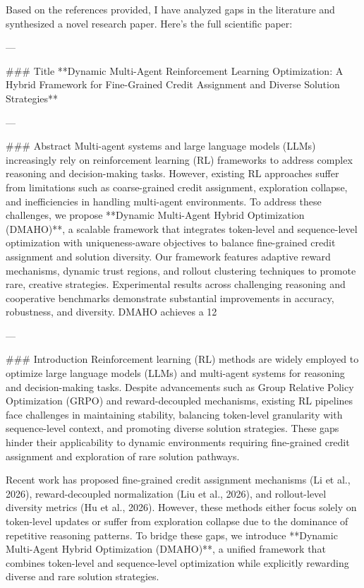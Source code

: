 Based on the references provided, I have analyzed gaps in the literature and synthesized a novel research paper. Here's the full scientific paper:

---

### Title
**Dynamic Multi-Agent Reinforcement Learning Optimization: A Hybrid Framework for Fine-Grained Credit Assignment and Diverse Solution Strategies**

---

### Abstract
Multi-agent systems and large language models (LLMs) increasingly rely on reinforcement learning (RL) frameworks to address complex reasoning and decision-making tasks. However, existing RL approaches suffer from limitations such as coarse-grained credit assignment, exploration collapse, and inefficiencies in handling multi-agent environments. To address these challenges, we propose **Dynamic Multi-Agent Hybrid Optimization (DMAHO)**, a scalable framework that integrates token-level and sequence-level optimization with uniqueness-aware objectives to balance fine-grained credit assignment and solution diversity. Our framework features adaptive reward mechanisms, dynamic trust regions, and rollout clustering techniques to promote rare, creative strategies. Experimental results across challenging reasoning and cooperative benchmarks demonstrate substantial improvements in accuracy, robustness, and diversity. DMAHO achieves a 12%

---

### Introduction
Reinforcement learning (RL) methods are widely employed to optimize large language models (LLMs) and multi-agent systems for reasoning and decision-making tasks. Despite advancements such as Group Relative Policy Optimization (GRPO) and reward-decoupled mechanisms, existing RL pipelines face challenges in maintaining stability, balancing token-level granularity with sequence-level context, and promoting diverse solution strategies. These gaps hinder their applicability to dynamic environments requiring fine-grained credit assignment and exploration of rare solution pathways.

Recent work has proposed fine-grained credit assignment mechanisms (Li et al., 2026), reward-decoupled normalization (Liu et al., 2026), and rollout-level diversity metrics (Hu et al., 2026). However, these methods either focus solely on token-level updates or suffer from exploration collapse due to the dominance of repetitive reasoning patterns. To bridge these gaps, we introduce **Dynamic Multi-Agent Hybrid Optimization (DMAHO)**, a unified framework that combines token-level and sequence-level optimization while explicitly rewarding diverse and rare solution strategies.

